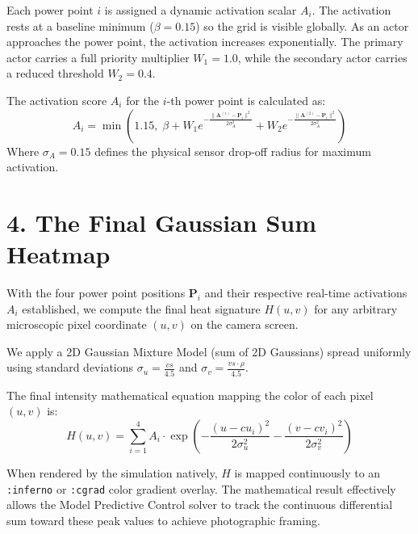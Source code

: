\documentclass[12pt, a4paper]{article}
\begin{document}
Each power point $i$ is assigned a dynamic activation scalar $A_i$. The activation rests at a baseline minimum ($\beta = 0.15$) so the grid is visible globally. As an actor approaches the power point, the activation increases exponentially. The primary actor carries a full priority multiplier $W_1 = 1.0$, while the secondary actor carries a reduced threshold $W_2 = 0.4$.

The activation score $A_i$ for the $i$-th power point is calculated as:
\begin{equation}
A_i = \min\left(1.15, \;\beta + W_1 e^{-\frac{\|\mathbf{A}^{(1)} - \mathbf{P}_i\|^2}{2\sigma_A^2}} + W_2 e^{-\frac{\|\mathbf{A}^{(2)} - \mathbf{P}_i\|^2}{2\sigma_A^2}}\right)
\end{equation}
Where $\sigma_A = 0.15$ defines the physical sensor drop-off radius for maximum activation.

\section*{4. The Final Gaussian Sum Heatmap}
With the four power point positions $\mathbf{P}_i$ and their respective real-time activations $A_i$ established, we compute the final heat signature $H(u,v)$ for any arbitrary microscopic pixel coordinate $(u,v)$ on the camera screen. 

We apply a 2D Gaussian Mixture Model (sum of 2D Gaussians) spread uniformly using standard deviations $\sigma_u = \frac{vs}{4.5}$ and $\sigma_v = \frac{vs\cdot\rho}{4.5}$. 

The final intensity mathematical equation mapping the color of each pixel $(u, v)$ is:
\begin{equation}
H(u, v) = \sum_{i=1}^{4} A_i \cdot \exp\left( - \frac{(u - cu_i)^2}{2\sigma_u^2} - \frac{(v - cv_i)^2}{2\sigma_v^2} \right)
\end{equation}

When rendered by the simulation natively, $H$ is mapped continuously to an \texttt{:inferno} or \texttt{:cgrad} color gradient overlay. The mathematical result effectively allows the Model Predictive Control solver to track the continuous differential sum toward these peak values to achieve photographic framing.
\end{document}
